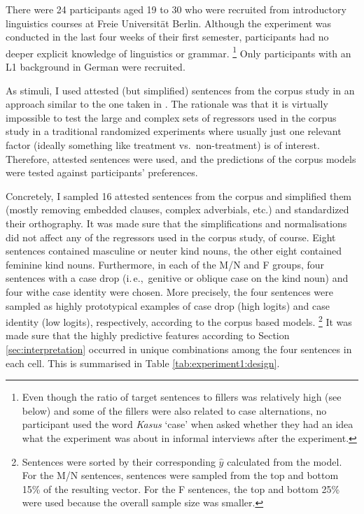 \documentclass[USenglish]{article}
\newcommand{\ie}{i.\,e.,}
\begin{document}
There were 24 participants aged 19 to 30 who were recruited from introductory linguistics courses at Freie Universität Berlin.
Although the experiment was conducted in the last four weeks of their first semester, participants had no deeper explicit knowledge of linguistics or grammar.%
\footnote{Even though the ratio of target sentences to fillers was relatively high (see below) and some of the fillers were also related to case alternations, no participant used the word \textit{Kasus} `case' when asked whether they had an idea what the experiment was about in informal interviews after the experiment.}
Only participants with an L1 background in German were recruited.

As stimuli, I used attested (but simplified) sentences from the corpus study in an approach similar to the one taken in \cite{DivjakEa2016}.
The rationale was that it is virtually impossible to test the large and complex sets of regressors used in the corpus study in a traditional randomized experiments where usually just one relevant factor (ideally something like treatment vs.\ non-treatment) is of interest.
Therefore, attested sentences were used, and the predictions of the corpus models were tested against participants' preferences.

Concretely, I sampled 16 attested sentences from the corpus and simplified them (mostly removing embedded clauses, complex adverbials, etc.) and standardized their orthography.
It was made sure that the simplifications and normalisations did not affect any of the regressors used in the corpus study, of course.
Eight sentences contained masculine or neuter kind nouns, the other eight contained feminine kind nouns.
Furthermore, in each of the M\slash N and F groups, four sentences with a case drop (\ie\ genitive or oblique case on the kind noun) and four withe case identity were chosen.
More precisely, the four sentences were sampled as highly prototypical examples of case drop (high logits) and case identity (low logits), respectively, according to the corpus based models.%
\footnote{Sentences were sorted by their corresponding $\hat{y}$ calculated from the model.
For the M\slash N sentences, sentences were sampled from the top and bottom 15\% of the resulting vector.
For the F sentences, the top and bottom 25\% were used because the overall sample size was smaller.}
It was made sure that the highly predictive features according to Section \ref{sec:interpretation} occurred in unique combinations among the four sentences in each cell.
This is summarised in Table \ref{tab:experiment1:design}.
\end{document}
